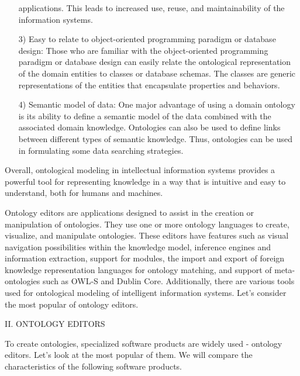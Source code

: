 \documentclass[a4paper,10pt,twocolumn]{article}
\begin{document}
\twocolumn
\frenchspacing
\setcounter{page}{264}
\begin{enumerate}
	\item[]{applications. This leads to increased use, reuse, and
	maintainability of the information systems.}
	\item[3)] {Easy to relate to object-oriented programming
	paradigm or database design: Those who are familiar
	with the object-oriented programming paradigm
	or database design can easily relate the ontological
	representation of the domain entities to classes or
	database schemas. The classes are generic representations
	of the entities that encapsulate properties
	and behaviors.}
	\item[4)] {Semantic model of data: One major advantage of
	using a domain ontology is its ability to define
	a semantic model of the data combined with the
	associated domain knowledge. Ontologies can also
	be used to define links between different types of
	semantic knowledge. Thus, ontologies can be used
	in formulating some data searching strategies.}
\end{enumerate}

Overall, ontological modeling in intellectual information
systems provides a powerful tool for representing
knowledge in a way that is intuitive and easy to understand,
both for humans and machines.

Ontology editors are applications designed to assist
in the creation or manipulation of ontologies. They use
one or more ontology languages to create, visualize, and
manipulate ontologies. These editors have features such
as visual navigation possibilities within the knowledge
model, inference engines and information extraction,
support for modules, the import and export of foreign
knowledge representation languages for ontology matching,
and support of meta-ontologies such as OWL-S
and Dublin Core. Additionally, there are various tools
used for ontological modeling of intelligent information
systems. Let’s consider the most popular of ontology
editors. 
\begin{center}
\large{II. O}\small{NTOLOGY} \large{E}\small{DITORS}
\end{center}

To create ontologies, specialized software products are
widely used - ontology editors. Let’s look at the most
popular of them. We will compare the characteristics of
the following software products.
\end{document}
